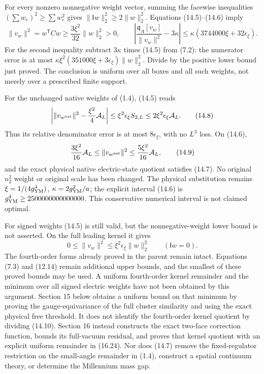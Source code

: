 \documentclass[
]{article}
\begin{document}
For every nonzero nonnegative weight vector, summing the facewise
inequalities \((\sum w_e)^2\ge\sum w_e^2\) gives
\(\|\mathsf Iw\|_2^2\ge2\|w\|_2^2\). Equations (14.5)--(14.6) imply \[
\|v_w\|^2=w^{\mathsf T}Cw\ge\frac{3\xi^2}{32}\|w\|_2^2>0,
\qquad
\left|\frac{\mathfrak q_A[v_w]}{\|v_w\|^2}-3\kappa\right|
\le\kappa(3744000\xi+32\epsilon_\xi).                        \tag{14.7}
\] For the second inequality subtract \(3\kappa\) times (14.5) from
(7.2): the numerator error is at most
\(\kappa\xi^2(351000\xi+3\epsilon_\xi)\|w\|_2^2\). Divide by the
positive lower bound just proved. The conclusion is uniform over all
boxes and all such weights, not merely over a prescribed finite support.

For the unchanged native weights of (1.4), (14.5) reads \[
\left|\|v_{w^{\rm nat}}\|^2-\frac{\xi^2}{4}\mathcal A_L\right|
\le\xi^2\epsilon_\xi S_{2,L}
\le2\xi^2\epsilon_\xi\mathcal A_L.                            \tag{14.8}
\] Thus its relative denominator error is at most \(8\epsilon_\xi\),
with no \(L^3\) loss. On (14.6), \[
\frac{3\xi^2}{16}\mathcal A_L
\le\|v_{w^{\rm nat}}\|^2
\le\frac{5\xi^2}{16}\mathcal A_L,                             \tag{14.9}
\] and the exact physical native electric-state quotient satisfies
(14.7). No original \(n_2^2\) weight or original scale has been changed.
The physical substitution remains \(\xi=1/(4g_{\rm YM}^4)\),
\(\kappa=2g_{\rm YM}^2/a\); the explicit interval (14.6) is
\(g_{\rm YM}^4\ge2500000000000000\). This conservative numerical
interval is not claimed optimal.

For signed weights (14.5) is still valid, but the nonnegative-weight
lower bound is not asserted. On the full leading kernel it gives \[
0\le\|v_w\|^2\le\xi^2\epsilon_\xi\|w\|_2^2
\qquad(\mathsf Iw=0).                                       \tag{14.10}
\] The fourth-order forms already proved in the parent remain intact.
Equations (7.3) and (12.14) remain additional upper bounds, and the
smallest of these proved bounds may be used. A uniform fourth-order
kernel remainder and the minimum over all signed electric weights have
not been obtained by this argument. Section 15 below obtains a uniform
bound on that minimum by proving the gauge-equivariance of the full
cluster similarity and using the exact physical free threshold. It does
not identify the fourth-order kernel quotient by dividing (14.10).
Section 16 instead constructs the exact two-face correction function,
bounds its full-vacuum residual, and proves that kernel quotient with an
explicit uniform remainder in (16.24). Nor does (14.7) remove the
fixed-regulator restriction on the small-angle remainder in (1.4),
construct a spatial continuum theory, or determine the Millennium mass
gap.
\end{document}
